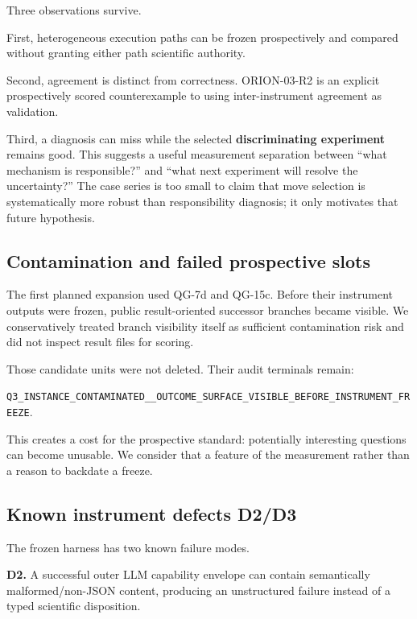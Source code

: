 \documentclass[10pt]{article}
\begin{document}
Three observations survive.

First, heterogeneous execution paths can be frozen prospectively and
compared without granting either path scientific authority.

Second, agreement is distinct from correctness. ORION-03-R2 is an
explicit prospectively scored counterexample to using inter-instrument
agreement as validation.

Third, a diagnosis can miss while the selected \textbf{discriminating
experiment} remains good. This suggests a useful measurement separation
between ``what mechanism is responsible?'' and ``what next experiment
will resolve the uncertainty?'' The case series is too small to claim
that move selection is systematically more robust than responsibility
diagnosis; it only motivates that future hypothesis.

\hypertarget{contamination-and-failed-prospective-slots}{%
\subsection{Contamination and failed prospective
slots}\label{contamination-and-failed-prospective-slots}}

The first planned expansion used QG-7d and QG-15c. Before their
instrument outputs were frozen, public result-oriented successor
branches became visible. We conservatively treated branch visibility
itself as sufficient contamination risk and did not inspect result files
for scoring.

Those candidate units were not deleted. Their audit terminals remain:

\texttt{Q3\_INSTANCE\_CONTAMINATED\_\_OUTCOME\_SURFACE\_VISIBLE\_BEFORE\_INSTRUMENT\_FREEZE}.

This creates a cost for the prospective standard: potentially
interesting questions can become unusable. We consider that a feature of
the measurement rather than a reason to backdate a freeze.

\hypertarget{known-instrument-defects-d2d3}{%
\subsection{Known instrument defects
D2/D3}\label{known-instrument-defects-d2d3}}

The frozen harness has two known failure modes.

\textbf{D2.} A successful outer LLM capability envelope can contain
semantically malformed/non-JSON content, producing an unstructured
failure instead of a typed scientific disposition.
\end{document}
